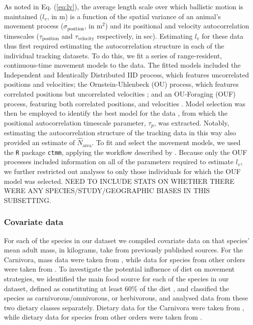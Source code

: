 \documentclass[12pt]{article}
\begin{document}
As noted in Eq. (\ref{eq:lv}), the average length scale over which ballistic motion is maintained ($l_v$, in m) is a function of the spatial variance of an animal's movement process ($\sigma_{\mathrm{position}}$, in m$^2$) and its positional and velocity autocorrelation timescales ($\tau_{\mathrm{position}}$ and $\tau_\mathrm{velocity}$ respectively, in sec). Estimating $l_v$ for these data thus first required estimating the autocorrelation structure in each of the individual tracking datasets. To do this, we fit a series of range-resident, continuous-time movement models to the data. The fitted models included the Independent and Identically Distributed IID process, which features uncorrelated positions and velocities; the Ornstein-Uhlenbeck (OU) process, which features correlated positions but uncorrelated velocities \cite{Uhlenbeck:1930fw}; and an OU-Foraging (OUF) process, featuring both correlated positions, and velocities \cite{Fleming:2014jr, Fleming:2014gd}. Model selection was then be employed to identify the best model for the data \cite{Fleming:2014gd, Fleming:2015fo}, from which the positional autocorrelation timescale parameter, $\tau_p$, was extracted. Notably, estimating the autocorrelation structure of the tracking data in this way also provided an estimate of $\hat{N}_\mathrm{area}$. To fit and select the movement models, we used the \texttt{R} package \texttt{ctmm}, applying the workflow described by \cite{Calabrese:2016ey}. Because only the OUF processes included information on all of the parameters required to estimate $l_v$, we further restricted out analyses to only those individuals for which the OUF model was selected. NEED TO INCLUDE STATS ON WHETHER THERE WERE ANY SPECIES/STUDY/GEOGRAPHIC BIASES IN THIS SUBSETTING.

\subsubsection*{Covariate data}

For each of the species in our dataset we compiled covariate data on that species' mean adult mass, in kilograms, take from previously published sources. For the Carnivora, mass data were taken from \cite{Noonan:2015kg}, while data for species from other orders were taken from \cite{Myers:2019}. To investigate the potential influence of diet on movement strategies, we identified the main food source for each of the species in our dataset, defined as constituting at least 60\% of the diet \cite{Gittleman:1985il, Noonan:2015kg}, and classified the species as carnivorous/omnivorous, or herbivorous, and analysed data from these two dietary classes separately. Dietary data for the Carnivora were taken from \cite{Noonan:2015kg}, while dietary data for species from other orders were taken from \cite{Myers:2019}.
\end{document}
